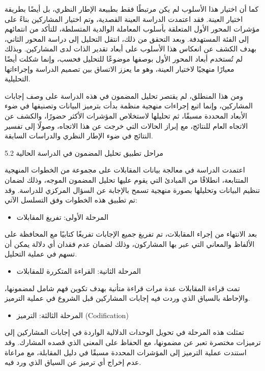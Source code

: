 \documentclass[12pt,oneside]{report}
\begin{document}
كما أن اختيار هذا الأسلوب لم يكن مرتبطًا فقط بطبيعة الإطار النظري، بل أيضًا بطريقة اختيار العينة. فقد اعتمدت الدراسة العينة القصدية، وتم اختيار المشاركين بناءً على مؤشرات المحور الأول المتعلقة بأسلوب المعاملة الوالدية المتسلطة، للتأكد من انتمائهم إلى الفئة المستهدفة. وبعد التحقق من ذلك، انتقل التحليل إلى دراسة المحور الثاني، بهدف الكشف عن انعكاس هذا الأسلوب على أبعاد تقدير الذات لدى المشاركين. وبذلك لم تُستخدم أبعاد المحور الأول بوصفها موضوعًا للتحليل فحسب، وإنما شكلت أيضًا معيارًا منهجيًا لاختيار العينة، وهو ما يعزز الاتساق بين تصميم الدراسة وإجراءاتها التحليلية.

ومن هذا المنطلق، لم يقتصر تحليل المضمون في هذه الدراسة على وصف إجابات المشاركين، وإنما اتبع إجراءات منهجية منظمة بدأت بترميز البيانات وتصنيفها في ضوء الأبعاد المحددة مسبقًا، ثم تحليلها لاستخلاص المؤشرات الأكثر حضورًا، والكشف عن الاتجاه العام للنتائج، مع إبراز الحالات التي خرجت عن هذا الاتجاه، وصولًا إلى تفسير النتائج في ضوء الإطار النظري والدراسات السابقة.

\textenglish{5.2} مراحل تطبيق تحليل المضمون في الدراسة الحالية

اعتمدت الدراسة في معالجة بيانات المقابلات على مجموعة من الخطوات المنهجية المتتابعة، انطلاقًا من المبادئ التي يقوم عليها تحليل المضمون الموجه، وذلك لضمان تنظيم البيانات وتحليلها بصورة منهجية تسمح بالإجابة عن السؤال المركزي للدراسة. وقد تم تطبيق هذه الخطوات وفق التسلسل الآتي:

\begin{itemize}[leftmargin=1.6em,itemsep=1pt]
\item المرحلة الأولى: تفريغ المقابلات
\end{itemize}
بعد الانتهاء من إجراء المقابلات، تم تفريغ جميع الإجابات تفريغًا كتابيًا مع المحافظة على الألفاظ والمعاني التي عبر بها المشاركون، وذلك لضمان عدم فقدان أي دلالة يمكن أن تسهم في عملية التحليل.

\begin{itemize}[leftmargin=1.6em,itemsep=1pt]
\item المرحلة الثانية: القراءة المتكررة للمقابلات
\end{itemize}
تمت قراءة المقابلات عدة مرات قراءة متأنية بهدف تكوين فهم شامل لمضمونها، والإحاطة بالسياق الذي وردت فيه إجابات المشاركين قبل الشروع في عملية الترميز.

\begin{itemize}[leftmargin=1.6em,itemsep=1pt]
\item المرحلة الثالثة: الترميز (Codification)
\end{itemize}
تمثلت هذه المرحلة في تحويل الوحدات الدلالية الواردة في إجابات المشاركين إلى ترميزات مختصرة تعبر عن مضمونها، مع الحفاظ على المعنى الذي قصده المشارك. وقد استندت عملية الترميز إلى المؤشرات المحددة مسبقًا في دليل المقابلة، مع مراعاة عدم إخراج أي ترميز عن السياق الذي ورد فيه.
\end{document}
